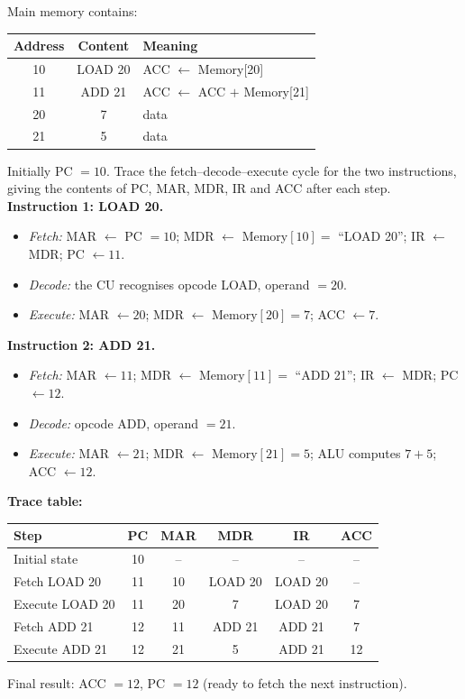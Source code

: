 \documentclass[11pt]{article}
\begin{document}
\begin{exoresolu}
Main memory contains:
\begin{center}
\begin{tabular}{|c|c|l|}
\hline
\rowcolor{popblueL} Address & Content & Meaning \\ \hline
10 & LOAD 20 & ACC $\leftarrow$ Memory[20] \\ \hline
11 & ADD 21 & ACC $\leftarrow$ ACC $+$ Memory[21] \\ \hline
20 & 7 & data \\ \hline
21 & 5 & data \\ \hline
\end{tabular}
\end{center}
Initially PC $= 10$. Trace the fetch–decode–execute cycle for the two instructions, giving the contents of PC, MAR, MDR, IR and ACC after each step.
\tcblower
\textbf{Instruction 1: LOAD 20.}
\begin{itemize}
\item \emph{Fetch:} MAR $\leftarrow$ PC $=10$; MDR $\leftarrow$ Memory$[10]=$ ``LOAD 20''; IR $\leftarrow$ MDR; PC $\leftarrow 11$.
\item \emph{Decode:} the CU recognises opcode LOAD, operand $=20$.
\item \emph{Execute:} MAR $\leftarrow 20$; MDR $\leftarrow$ Memory$[20]=7$; ACC $\leftarrow 7$.
\end{itemize}
\textbf{Instruction 2: ADD 21.}
\begin{itemize}
\item \emph{Fetch:} MAR $\leftarrow 11$; MDR $\leftarrow$ Memory$[11]=$ ``ADD 21''; IR $\leftarrow$ MDR; PC $\leftarrow 12$.
\item \emph{Decode:} opcode ADD, operand $=21$.
\item \emph{Execute:} MAR $\leftarrow 21$; MDR $\leftarrow$ Memory$[21]=5$; ALU computes $7+5$; ACC $\leftarrow 12$.
\end{itemize}
\textbf{Trace table:}
\begin{center}
\begin{tabular}{|l|c|c|c|c|c|}
\hline
\rowcolor{popblueL} Step & PC & MAR & MDR & IR & ACC \\ \hline
Initial state & 10 & -- & -- & -- & -- \\ \hline
Fetch LOAD 20 & 11 & 10 & LOAD 20 & LOAD 20 & -- \\ \hline
Execute LOAD 20 & 11 & 20 & 7 & LOAD 20 & 7 \\ \hline
Fetch ADD 21 & 12 & 11 & ADD 21 & ADD 21 & 7 \\ \hline
Execute ADD 21 & 12 & 21 & 5 & ADD 21 & 12 \\ \hline
\end{tabular}
\end{center}
Final result: ACC $=12$, PC $=12$ (ready to fetch the next instruction).
\end{exoresolu}
\end{document}
